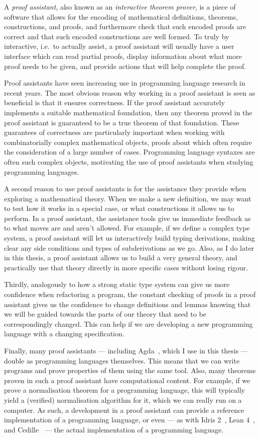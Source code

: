 A \emph{proof assistant}, also known as an \emph{interactive theorem prover}, is
a piece of software that allows for the encoding of mathematical definitions,
theorems, constructions, and proofs, and furthermore check that such encoded
proofs are correct and that such encoded constructions are well formed.
To truly by interactive, i.e.\ to actually assist, a proof assistant will
usually have a user interface which can read partial proofs, display
information about what more proof needs to be given, and provide actions that
will help complete the proof.

Proof assistants have seen increasing use in programming language research in
recent years.
The most obvious reason why working in a proof assistant is seen as beneficial
is that it ensures correctness.
If the proof assistant accurately implements a suitable mathematical foundation,
then any theorem proved in the proof assistant is guaranteed to be a true
theorem of that foundation.
These guarantees of correctness are particularly important when working with
combinatorially complex mathematical objects, proofs about which often require
the consideration of a large number of cases.
Programming language syntaxes are often such complex objects, motivating the use
of proof assistants when studying programming languages.

A second reason to use proof assistants is for the assistance they provide when
exploring a mathematical theory.
When we make a new definition, we may want to test how it works in a special
case, or what constructions it allows us to perform.
In a proof assistant, the assistance tools give us immediate feedback as to what
moves are and aren't allowed.
For example, if we define a complex type system, a proof assistant will let us
interactively build typing derivations, making clear any side conditions and
types of subderivations as we go.
Also, as I do later in this thesis, a proof assistant allows us to build a very
general theory, and practically use that theory directly in more specific cases
without losing rigour.

Thirdly, analogously to how a strong static type system can give us more
confidence when refactoring a program, the constant checking of proofs in a
proof assistant gives us the confidence to change definitions and lemmas knowing
that we will be guided towards the parts of our theory that need to be
correspondingly changed.
This can help if we are developing a new programming language with a changing
specification.

Finally, many proof assistants --- including Agda~\citep{Agda}, which I use in
this thesis --- double as programming languages themselves.
This means that we can write programs and prove properties of them using the same
tool.
Also, many theorems proven in such a proof assistant have computational content.
For example, if we prove a normalisation theorem for a programming language,
this will typically yield a (verified) normalisation algorithm for it, which we
can really run on a computer.
As such, a development in a proof assistant can provide a reference
implementation of a programming language, or even --- as with Idris
2~\citep{Brady21}, Lean 4~\citep{deMU21}, and Cedille~\citep{GRS16} --- the
actual implementation of a programming language.


